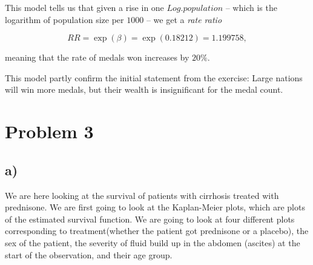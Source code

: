 \documentclass[a4paper,norsk, 10pt]{article}
\begin{document}
This model tells us that given a rise in one $Log.population$ -- which is the logarithm of population size per $1000$ -- we get a \textit{rate ratio}

\begin{equation}
RR = \exp(\beta) = \exp(0.18212) = 1.199758,
\end{equation}

meaning that the rate of medals won increases by $20\%$.

This model partly confirm the initial statement from the exercise: Large nations will win more medals, but their wealth is insignificant for the medal count.

\section{Problem 3}

\subsection{a)}
We are here looking at the survival of patients with cirrhosis treated with prednisone. We are first going to look at the Kaplan-Meier plots, which are plots of the estimated survival function. We are going to look at four different plots corresponding to treatment(whether the patient got prednisone or a placebo), the sex of the patient, the severity of fluid build up in the abdomen (ascites) at the start of the observation, and their age group.
\end{document}
